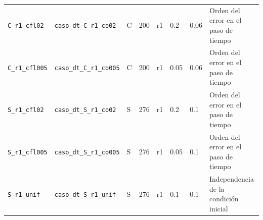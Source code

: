 \begin{longtable}{p{2.0cm}p{5.0cm}p{0.8cm}p{1.7cm}p{0.8cm}p{0.7cm}p{0.8cm}p{2.5cm}}
\scriptsize \texttt{C\_\allowbreak r1\_\allowbreak cfl02} & \scriptsize \texttt{caso\_\allowbreak dt\_\allowbreak C\_\allowbreak r1\_\allowbreak co02} & \scriptsize C & \scriptsize 200 & \scriptsize r1 & \scriptsize 0.2 & \scriptsize 0.06 & \scriptsize Orden del error en el paso de tiempo \\
\scriptsize \texttt{C\_\allowbreak r1\_\allowbreak cfl005} & \scriptsize \texttt{caso\_\allowbreak dt\_\allowbreak C\_\allowbreak r1\_\allowbreak co005} & \scriptsize C & \scriptsize 200 & \scriptsize r1 & \scriptsize 0.05 & \scriptsize 0.06 & \scriptsize Orden del error en el paso de tiempo \\
\scriptsize \texttt{S\_\allowbreak r1\_\allowbreak cfl02} & \scriptsize \texttt{caso\_\allowbreak dt\_\allowbreak S\_\allowbreak r1\_\allowbreak co02} & \scriptsize S & \scriptsize 276 & \scriptsize r1 & \scriptsize 0.2 & \scriptsize 0.1 & \scriptsize Orden del error en el paso de tiempo \\
\scriptsize \texttt{S\_\allowbreak r1\_\allowbreak cfl005} & \scriptsize \texttt{caso\_\allowbreak dt\_\allowbreak S\_\allowbreak r1\_\allowbreak co005} & \scriptsize S & \scriptsize 276 & \scriptsize r1 & \scriptsize 0.05 & \scriptsize 0.1 & \scriptsize Orden del error en el paso de tiempo \\
\scriptsize \texttt{S\_\allowbreak r1\_\allowbreak unif} & \scriptsize \texttt{caso\_\allowbreak dt\_\allowbreak S\_\allowbreak r1\_\allowbreak unif} & \scriptsize S & \scriptsize 276 & \scriptsize r1 & \scriptsize 0.1 & \scriptsize 0.1 & \scriptsize Independencia de la condición inicial \\
\end{longtable}

